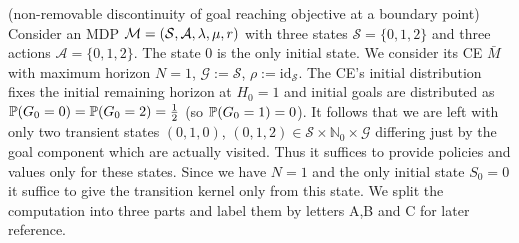 \begin{example} (non-removable discontinuity of goal reaching objective at a boundary point)
\label{ex:boundarypoint}
Consider an MDP $\mathcal{M} = (\mathcal{S},\mathcal{A},\mathit{\lambda},\mu,r)$
with three states $\mathcal{S} = \{0,1,2\}$ and three actions
$\mathcal{A} = \{0,1,2\}$. The state 0 is the only initial state.
We consider its CE $\bar{M}$ with maximum horizon $N=1$, $\mathcal{G}:=\mathcal{S}$, $\rho := \mathrm{id}_{\mathcal{S}}$. The CE's initial distribution fixes the initial remaining horizon at $H_0=1$ and initial goals
are distributed as $\mathbb{P}(G_0=0) = \mathbb{P}(G_0=2) = \frac{1}{2}$ (so $\mathbb{P}(G_0=1) = 0$).
It follows that we are left with only two transient states $(0,1,0)$, $(0,1,2) \in \mathcal{S}\times\mathbb{N}_0\times\mathcal{G}$ differing just by the goal component which are actually visited. Thus it suffices
to provide policies and values only for these states. 
Since we have $N=1$
and the only initial state $S_0 = 0$ it suffice to give the transition kernel only
from this state.
We split the computation into three parts and label them by letters A,B and C for later reference.


\end{example}
